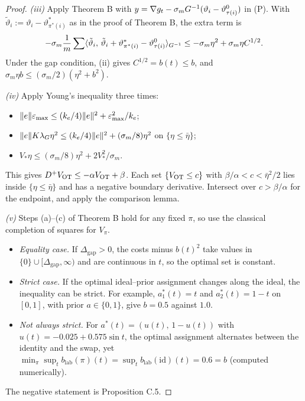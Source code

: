 \begin{proof}
\smallskip
\textit{(iii)} Apply Theorem B with $y = \nabla g_t - \sigma_mG^{-1}(\vartheta_i - \vartheta^0_{\tau(i)})$ in (P).
With $\tilde\vartheta_i := \vartheta_i - \vartheta^*_{\pi^*(i)}$ as in the proof of Theorem B, the extra term is
\[
  -\sigma_m\frac1m\sum\langle \tilde\vartheta_i,\, \tilde\vartheta_i + \vartheta^*_{\pi^*(i)} -
  \vartheta^0_{\tau(i)}\rangle_{G^{-1}} \le -\sigma_m\eta^2 + \sigma_m\eta C^{1/2}.
\]
Under the gap condition, (ii) gives $C^{1/2} = b(t) \le b$, and $\sigma_m\eta b \le (\sigma_m/2)(\eta^2 + b^2)$.

\smallskip
\textit{(iv)} Apply Young's inequality three times:
\begin{itemize}
  \item $\lVert e\rVert\varepsilon_{\max} \le (k_e/4)\lVert e\rVert^2 + \varepsilon_{\max}^2/k_e$;
  \item $\lVert e\rVert K\lambda_G\eta^2 \le (k_e/4)\lVert e\rVert^2 + (\sigma_m/8)\eta^2$ on $\{\eta\le\bar\eta\}$;
  \item $V_*\eta \le (\sigma_m/8)\eta^2 + 2V_*^2/\sigma_m$.
\end{itemize}
This gives $D^+V_{\mathrm{OT}} \le -\alpha V_{\mathrm{OT}} + \beta$. Each set $\{V_{\mathrm{OT}}\le c\}$ with $\beta/\alpha < c < \bar\eta^2/2$ lies
inside $\{\eta\le\bar\eta\}$ and has a negative boundary derivative. Intersect over $c > \beta/\alpha$ for the
endpoint, and apply the comparison lemma.

\smallskip
\textit{(v)} Steps (a)--(c) of Theorem B hold for any fixed $\pi$, so use the classical completion of squares for
$V_\pi$.
\begin{itemize}
  \item \emph{Equality case.} If $\Delta_{\mathrm{gap}}>0$, the costs minus $b(t)^2$ take values in
    $\{0\}\cup[\Delta_{\mathrm{gap}},\infty)$ and are continuous in $t$, so the optimal set is constant.
  \item \emph{Strict case.} If the optimal ideal--prior assignment changes along the ideal, the inequality can be
    strict. For example, $a^*_1(t) = t$ and $a^*_2(t) = 1-t$ on $[0,1]$, with prior $a\in\{0,1\}$, give $b = 0.5$
    against $1.0$.
  \item \emph{Not always strict.} For $a^*(t) = (u(t),\,1-u(t))$ with $u(t) = -0.025 + 0.575\sin t$, the optimal
    assignment alternates between the identity and the swap, yet
    $\min_\pi\sup_t b_{\mathrm{lab}}(\pi)(t) = \sup_t b_{\mathrm{lab}}(\mathrm{id})(t) = 0.6 = b$ (computed numerically).
\end{itemize}
The negative statement is Proposition C.5.
\end{proof}

